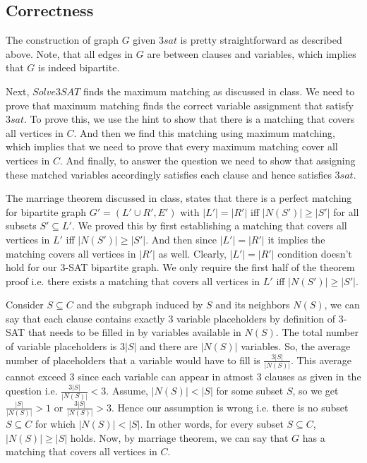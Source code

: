 \documentclass{article}
\begin{document}
    \subsection*{Correctness}
    The construction of graph $G$ given $3sat$ is pretty straightforward as described above. Note, that all edges in $G$ are between clauses and variables, which implies that $G$ is indeed bipartite.

    Next, $Solve3SAT$ finds the maximum matching as discussed in class. We need to prove that maximum matching finds the correct variable assignment that satisfy $3sat$. To prove this, we use the hint to show that there is a matching that covers all vertices in $C$. And then we find this matching using maximum matching, which implies that we need to prove that every maximum matching cover all vertices in $C$. And finally, to answer the question we need to show that assigning these matched variables accordingly satisfies each clause and hence satisfies $3sat$.

    The marriage theorem discussed in class, states that there is a perfect matching for bipartite graph $G' = (L' \cup R', E')$ with $|L'| = |R'|$ iff $|N(S')| \ge |S'|$ for all subsets $S' \subseteq L'$. We proved this by first establishing a matching that covers all vertices in $L'$ iff $|N(S')| \ge |S'|$. And then since $|L'| = |R'|$ it implies the matching covers all vertices in $|R'|$ as well. Clearly, $|L'| = |R'|$ condition doesn't hold for our 3-SAT bipartite graph. We only require the first half of the theorem proof i.e. there exists a matching that covers all vertices in $L'$ iff $|N(S')| \ge |S'|$.

    Consider $S \subseteq C$ and the subgraph induced by $S$ and its neighbors $N(S)$, we can say that each clause contains exactly 3 variable placeholders by definition of 3-SAT that needs to be filled in by variables available in $N(S)$. The total number of variable placeholders is $3|S|$ and there are $|N(S)|$ variables. So, the average number of placeholders that a variable would have to fill is $\frac{3|S|}{|N(S)|}$. This average cannot exceed 3 since each variable can appear in atmost 3 clauses as given in the question i.e. $\frac{3|S|}{|N(S)|} < 3$. Assume, $|N(S)| < |S|$ for some subset $S$, so we get $\frac{|S|}{|N(S)|} > 1$ or $\frac{3|S|}{|N(S)|} > 3$. Hence our assumption is wrong i.e. there is no subset $S \subseteq C$ for which $|N(S)| < |S|$. In other words, for every subset $S \subseteq C$, $|N(S)| \ge |S|$ holds. Now, by marriage theorem, we can say that $G$ has a matching that covers all vertices in $C$.
\end{document}
